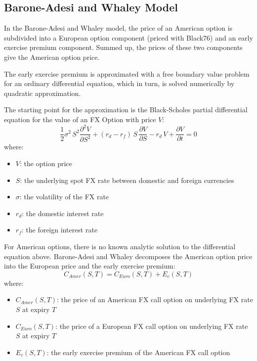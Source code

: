 \subsection{Barone-Adesi and Whaley Model}
\label{models:barone-adesi}

In the Barone-Adesi and Whaley model, the price of an American option is subdivided
into a European option component (priced with Black76) and an early exercise premium
component. Summed up, the prices of these two components give the American option price.

The early exercise premium is approximated with a free boundary value problem for an
ordinary differential equation, which in turn, is solved numerically by quadratic
approximation.

The starting point for the approximation is the Black-Scholes partial differential
equation for the value of an FX Option with price $V$:
$$
\frac{1}{2} \sigma^2\, S^2 \frac{\partial^2 V}{\partial S^2} +
(r_d -r_f)\, S\, \frac{\partial V}{\partial S} - r_d\, V
+\frac{\partial V}{\partial t} = 0
$$
where:
\begin{itemize}
\item $V$: the option price
\item $S$: the underlying spot FX rate between domestic and foreign currencies
\item $\sigma$: the volatility of the FX rate
\item $r_d$: the domestic interest rate
\item $r_f$: the foreign interest rate
\end{itemize}

For American options, there is no known analytic solution to the differential equation
above. Barone-Adesi and Whaley decomposes the American option price into the European
price and the early exercise premium:
$$
C_{Amer} (S,T)= C_{Euro} (S,T) + E_c (S,T)
$$
where:
\begin{itemize}
\item $C_{Amer} (S,T)$: the price of an American FX call option on underlying FX
rate $S$ at expiry $T$
\item $C_{Euro} (S,T)$: the price of a European FX call option on underlying FX
rate $S$ at expiry $T$
\item $E_c (S,T)$: the early exercise premium of the American FX call option
\end{itemize}

